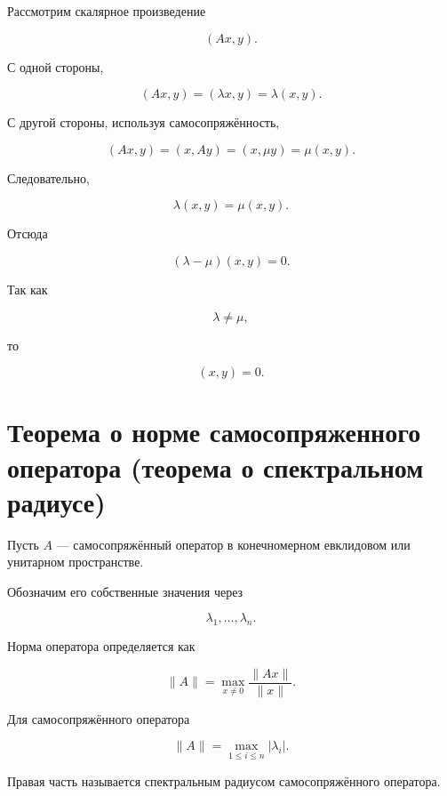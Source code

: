 \documentclass[14pt]{extreport}
\begin{document}
\begin{prbox}

Рассмотрим скалярное произведение

\[
(Ax,y).
\]

С одной стороны,

\[
(Ax,y)
=
(\lambda x,y)
=
\lambda(x,y).
\]

С другой стороны, используя самосопряжённость,

\[
(Ax,y)
=
(x,Ay)
=
(x,\mu y)
=
\mu(x,y).
\]

Следовательно,

\[
\lambda(x,y)
=
\mu(x,y).
\]

Отсюда

\[
(\lambda-\mu)(x,y)=0.
\]

Так как

\[
\lambda\neq\mu,
\]

то

\[
(x,y)=0.
\]

\end{prbox}

\chapter{ Теорема о норме самосопряженного оператора (теорема о спектральном радиусе)}
\begin{defbox}
Пусть \(A\) --- самосопряжённый оператор в конечномерном евклидовом
или унитарном пространстве.

Обозначим его собственные значения через

\[
\lambda_1,\ldots,\lambda_n.
\]

Норма оператора определяется как

\[
\|A\|
=
\max_{x\neq0}
\frac{\|Ax\|}{\|x\|}.
\]

\end{defbox}

\begin{thbox}

Для самосопряжённого оператора

\[
\|A\|
=
\max_{1\le i\le n}
|\lambda_i|.
\]

Правая часть называется спектральным радиусом самосопряжённого оператора.
\end{thbox}
\end{document}
